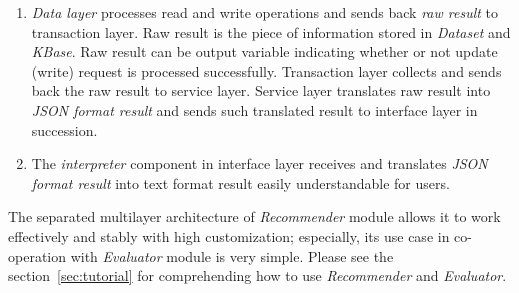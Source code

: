 \documentclass[a4paper,twoside]{article}
\begin{document}
\begin{enumerate}
\item \textit{Data layer} processes read and write operations and sends back \textit{raw result} to transaction layer. Raw result is the piece of information stored in \textit{Dataset} and \textit{KBase}. Raw result can be output variable indicating whether or not update (write) request is processed successfully. Transaction layer collects and sends back the raw result to service layer. Service layer translates raw result into \textit{JSON format result} and sends such translated result to interface layer in succession.
\item The \textit{interpreter} component in interface layer receives and translates \textit{JSON format result} into text format result easily understandable for users.
\end{enumerate}
The separated multilayer architecture of \textit{Recommender} module allows it to work effectively and stably with high customization; especially, its use case in co-operation with \textit{Evaluator} module is very simple. Please see the section~\ref{sec:tutorial} for comprehending how to use \textit{Recommender} and \textit{Evaluator}.
\end{document}
